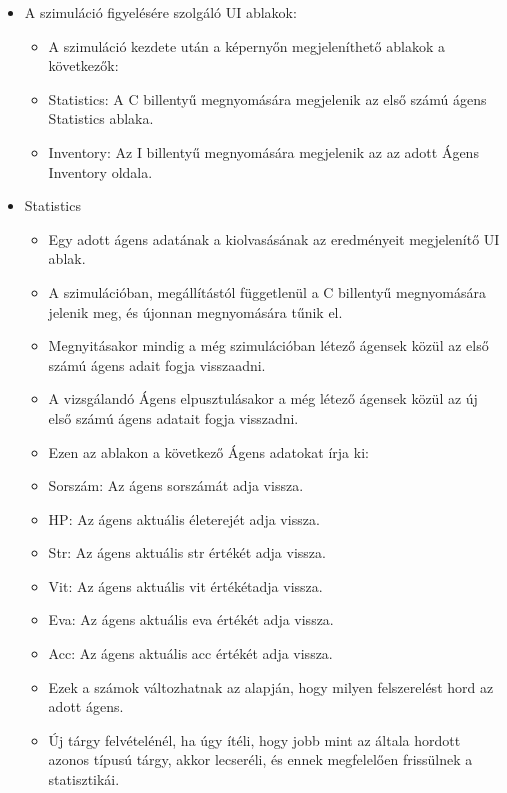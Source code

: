 \begin{itemize}
    \item A szimuláció figyelésére szolgáló UI ablakok:
    
    \begin{itemize}
        \item A szimuláció kezdete után a képernyőn megjeleníthető ablakok a következők:
        \item Statistics: A C billentyű megnyomására megjelenik az első számú ágens Statistics ablaka.
        \item Inventory: Az I billentyű megnyomására megjelenik az az adott Ágens Inventory oldala.
    \end{itemize}

    \item Statistics
    
    \begin{itemize}
        \item Egy adott ágens adatának a kiolvasásának az eredményeit megjelenítő UI ablak.
        \item A szimulációban, megállítástól függetlenül a C billentyű megnyomására jelenik meg, és újonnan megnyomására tűnik el.
        \item Megnyitásakor mindig a még szimulációban létező ágensek közül az első számú ágens adait fogja visszaadni.
        \item A vizsgálandó Ágens elpusztulásakor a még létező ágensek közül az új első számú ágens adatait fogja visszadni.
        \item Ezen az ablakon a következő Ágens adatokat írja ki:
        \item Sorszám: Az ágens sorszámát adja vissza.
        \item HP: Az ágens aktuális életerejét adja vissza.
        \item Str: Az ágens aktuális str értékét adja vissza.
        \item Vit: Az ágens aktuális vit értékétadja vissza.
        \item Eva: Az ágens aktuális eva értékét adja vissza.
        \item Acc: Az ágens aktuális acc értékét adja vissza.
        \item Ezek a számok változhatnak az alapján, hogy milyen felszerelést hord az adott ágens.
        \item Új tárgy felvételénél, ha úgy ítéli, hogy jobb mint az általa hordott azonos típusú tárgy, akkor lecseréli, és ennek megfelelően frissülnek a statisztikái.
    \end{itemize}


\end{itemize}
